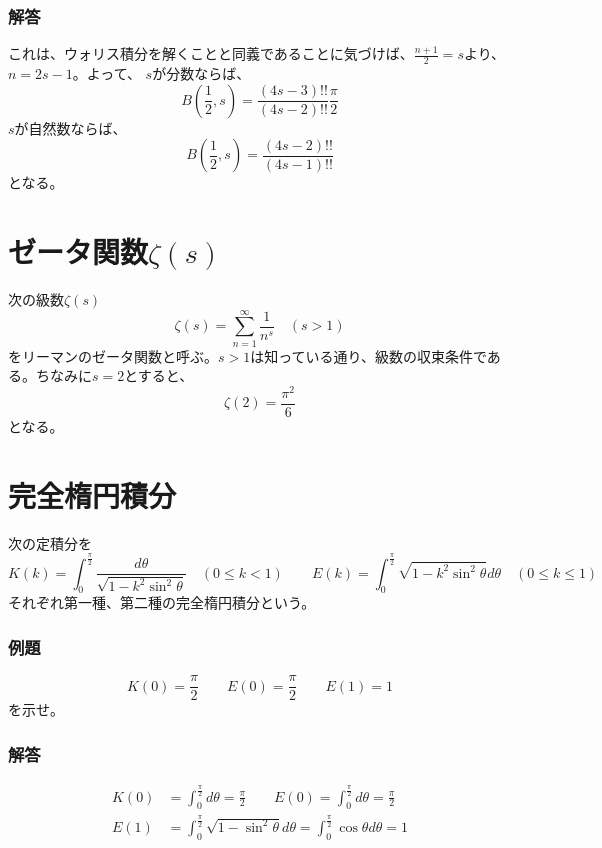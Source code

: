 \documentclass[a4j,dvipdfmx]{jsarticle}
\begin{document}
\subsubsection*{解答}
これは、ウォリス積分を解くことと同義であることに気づけば、$\frac{n+1}{2}=s$より、$n=2s-1$。よって、
$s$が分数ならば、
\begin{equation*}
    B\left(\frac{1}{2},s\right)=\frac{(4s-3)!!}{(4s-2)!!}\frac{\pi}{2}
\end{equation*}
$s$が自然数ならば、
\begin{equation*}
    B\left(\frac{1}{2},s\right)=\frac{(4s-2)!!}{(4s-1)!!}
\end{equation*}
となる。
\section{ゼータ関数$\zeta(s)$}
次の級数$\zeta(s)$
\begin{equation*}
    \zeta(s)=\sum_{n=1}^\infty \frac{1}{n^s}\quad(s>1)
\end{equation*}
をリーマンのゼータ関数と呼ぶ。$s>1$は知っている通り、級数の収束条件である。ちなみに$s=2$とすると、
\begin{equation*}
    \zeta(2)=\frac{\pi^2}{6}
\end{equation*}
となる。
\section{完全楕円積分}
次の定積分を
\begin{equation*}
    K(k)=\int_0^\frac{\pi}{2}\frac{d\theta}{\sqrt{1-k^2\sin^2\theta}}\quad(0\leq k<1)\qquad E(k)=\int_0^\frac{\pi}{2}\sqrt{1-k^2\sin^2\theta}d\theta\quad(0\leq k\leq 1)
\end{equation*}
それぞれ第一種、第二種の完全楕円積分という。
\subsubsection*{例題}
\begin{equation*}
    K(0)=\frac{\pi}{2}\qquad E(0)=\frac{\pi}{2}\qquad E(1)=1
\end{equation*}
を示せ。
\subsubsection*{解答}
\begin{align*}
    K(0)&=\int_0^\frac{\pi}{2}d\theta=\frac{\pi}{2}\qquad E(0)=\int_0^\frac{\pi}{2}d\theta=\frac{\pi}{2}\\
    E(1)&=\int_0^\frac{\pi}{2}\sqrt{1-\sin^2\theta}d\theta=\int_0^\frac{\pi}{2}\cos\theta d\theta=1
\end{align*}
\hrulefill
\end{document}
